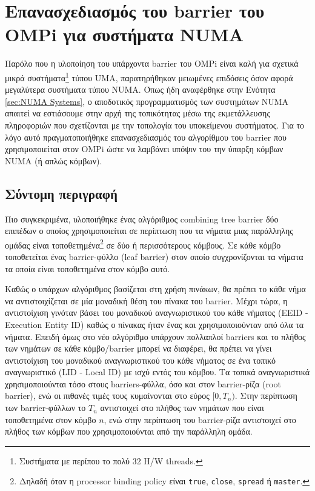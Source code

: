\section{Επανασχεδιασμός του barrier του OMPi για συστήματα NUMA}
Παρόλο που η υλοποίηση του υπάρχοντα barrier του OMPi είναι καλή για σχετικά μικρά συστήματα\footnote{Συστήματα με περίπου το πολύ 32 H/W threads.} τύπου UMA, παρατηρήθηκαν μειωμένες επιδόσεις όσον αφορά μεγαλύτερα συστήματα τύπου NUMA. Όπως ήδη αναφέρθηκε στην Ενότητα \ref{sec:NUMA Systems}, ο αποδοτικός προγραμματισμός των συστημάτων NUMA απαιτεί να εστιάσουμε στην αρχή της τοπικότητας μέσω της εκμετάλλευσης πληροφοριών που σχετίζονται με την τοπολογία του υποκείμενου συστήματος. Για το λόγο αυτό πραγματοποιήθηκε επανασχεδιασμός του αλγορίθμου του barrier που χρησιμοποιείται στον OMPi ώστε να λαμβάνει υπόψιν του την ύπαρξη κόμβων NUMA (ή απλώς κόμβων).

\subsection{Σύντομη περιγραφή}
Πιο συγκεκριμένα, υλοποιήθηκε ένας αλγόριθμος combining tree barrier δύο επιπέδων ο οποίος χρησιμοποιείται σε περίπτωση που τα νήματα μιας παράλληλης ομάδας είναι τοποθετημένα\footnote{Δηλαδή όταν η processor binding policy είναι \texttt{true}, \texttt{close}, \texttt{spread} ή \texttt{master}.} σε δύο ή περισσότερους κόμβους. Σε κάθε κόμβο τοποθετείται ένας barrier-φύλλο (leaf barrier) στον οποίο συγχρονίζονται τα νήματα τα οποία είναι τοποθετημένα στον κόμβο αυτό.

Καθώς ο υπάρχων αλγόριθμος βασίζεται στη χρήση πινάκων, θα πρέπει το κάθε νήμα να αντιστοιχίζεται σε μία μοναδική θέση του πίνακα του barrier. Μέχρι τώρα, η αντιστοίχιση γινόταν βάσει του μοναδικού αναγνωριστικού του κάθε νήματος (EEID - Execution Entity ID) καθώς ο πίνακας ήταν ένας και χρησιμοποιούνταν από όλα τα νήματα. Επειδή όμως στο νέο αλγόριθμο υπάρχουν πολλαπλοί barriers και το πλήθος των νημάτων σε κάθε κόμβο/barrier μπορεί να διαφέρει, θα πρέπει να γίνει αντιστοίχιση του μοναδικού αναγνωριστικού του κάθε νήματος σε ένα τοπικό αναγνωριστικό (LID - Local ID) με ισχύ εντός του κόμβου. Τα τοπικά αναγνωριστικά χρησιμοποιούνται τόσο στους barriers-φύλλα, όσο και στον barrier-ρίζα (root barrier), ενώ οι πιθανές τιμές τους κυμαίνονται στο εύρος $[0,T_n)$. Στην περίπτωση των barrier-φύλλων το $T_n$ αντιστοιχεί στο πλήθος των νημάτων που είναι τοποθετημένα στον κόμβο $n$, ενώ στην περίπτωση του barrier-ρίζα αντιστοιχεί στο πλήθος των κόμβων που χρησιμοποιούνται από την παράλληλη ομάδα.

